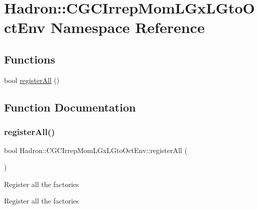 \hypertarget{namespaceHadron_1_1CGCIrrepMomLGxLGtoOctEnv}{}\section{Hadron\+:\+:C\+G\+C\+Irrep\+Mom\+L\+Gx\+L\+Gto\+Oct\+Env Namespace Reference}
\label{namespaceHadron_1_1CGCIrrepMomLGxLGtoOctEnv}
\subsection*{Functions}
\begin{DoxyCompactItemize}
\item 
bool \mbox{\hyperlink{namespaceHadron_1_1CGCIrrepMomLGxLGtoOctEnv_af4080789e3dc09dd752e71cb20ff3cb7}{register\+All}} ()
\end{DoxyCompactItemize}


\subsection{Function Documentation}
\mbox{\label{namespaceHadron_1_1CGCIrrepMomLGxLGtoOctEnv_af4080789e3dc09dd752e71cb20ff3cb7}} 
\subsubsection{\texorpdfstring{registerAll()}{registerAll()}}
{\footnotesize\ttfamily bool Hadron\+::\+C\+G\+C\+Irrep\+Mom\+L\+Gx\+L\+Gto\+Oct\+Env\+::register\+All (\begin{DoxyParamCaption}{ }\end{DoxyParamCaption})}

Register all the factories

Register all the factories

